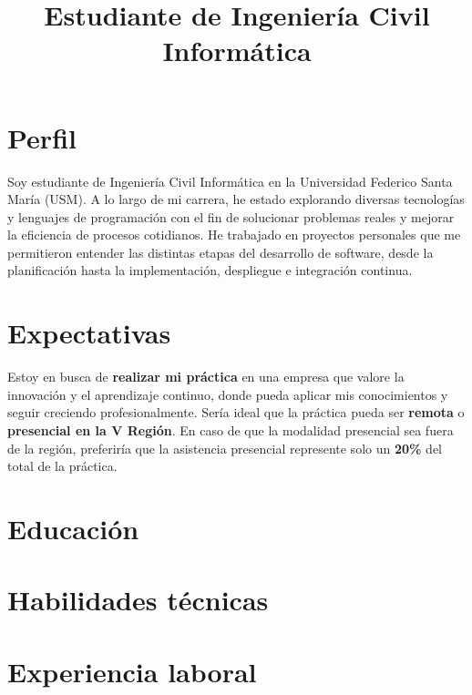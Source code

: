 \documentclass[11pt,a4paper,sans]{moderncv}
\title{Estudiante de Ingeniería Civil Informática}
\begin{document}
\makecvtitle

\section{Perfil}
Soy estudiante de Ingeniería Civil Informática en la Universidad Federico Santa María (USM).
A lo largo de mi carrera, he estado explorando diversas tecnologías y lenguajes de programación con el fin de solucionar problemas reales y mejorar la eficiencia de procesos cotidianos.
He trabajado en proyectos personales que me permitieron entender las distintas etapas del desarrollo de software, desde la planificación hasta la implementación, despliegue e integración continua.

\section{Expectativas}
Estoy en busca de \textbf{realizar mi práctica} en una empresa que valore la innovación y el aprendizaje continuo, donde pueda aplicar mis conocimientos y seguir creciendo profesionalmente.
Sería ideal que la práctica pueda ser \textbf{remota} o \textbf{presencial en la V Región}. En caso de que la modalidad presencial sea fuera de la región, preferiría que la asistencia presencial represente solo un \textbf{20\%} del total de la práctica.


\section{Educación}

\section{Habilidades técnicas}

\section{Experiencia laboral}
\end{document}
